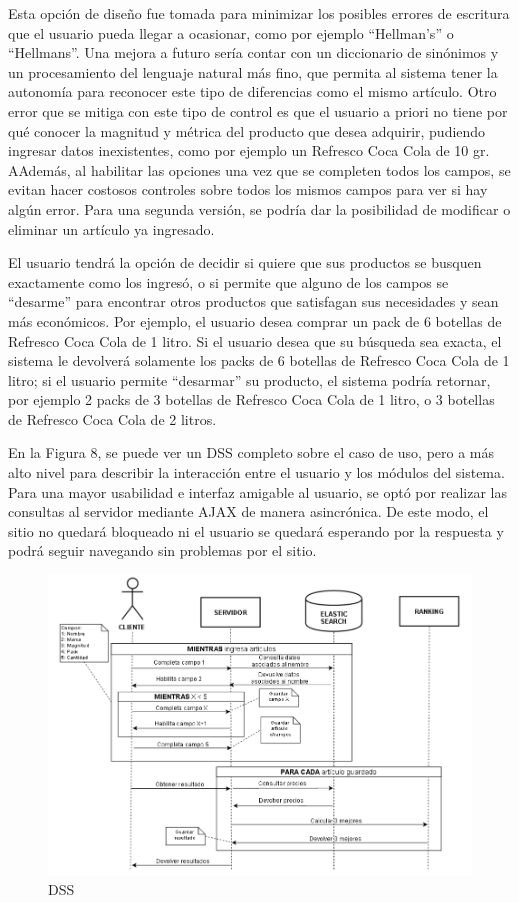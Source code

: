 \documentclass[12pt]{article} %
\begin{document}
Esta opción de diseño fue tomada para minimizar los posibles errores de escritura que el usuario pueda llegar a ocasionar, como por ejemplo “Hellman’s” o “Hellmans”. Una mejora a futuro sería contar con un diccionario de sinónimos y un procesamiento del lenguaje natural más fino, que permita al sistema tener la autonomía para reconocer este tipo de diferencias como el mismo artículo. Otro error que se mitiga con este tipo de control es que el usuario a priori no tiene por qué conocer la magnitud y métrica del producto que desea adquirir, pudiendo ingresar datos inexistentes, como por ejemplo un Refresco Coca Cola de 10 gr. AAdemás, al habilitar las opciones una vez que se completen todos los campos, se evitan hacer costosos controles sobre todos los mismos campos para ver si hay algún error. Para una segunda versión, se podría dar la posibilidad de modificar o eliminar un artículo ya ingresado.

El usuario tendrá la opción de decidir si quiere que sus productos se busquen exactamente como los ingresó, o si permite que alguno de los campos se “desarme” para encontrar otros productos que satisfagan sus necesidades y sean más económicos. 
Por ejemplo, el usuario desea comprar un pack de 6 botellas de Refresco Coca Cola de 1 litro. Si el usuario desea que su búsqueda sea exacta, el sistema le devolverá solamente los packs de 6 botellas de Refresco Coca Cola de 1 litro; si el usuario permite “desarmar” su producto, el sistema podría retornar, por ejemplo 2 packs de 3 botellas de Refresco Coca Cola de 1 litro, o 3 botellas de Refresco Coca Cola de 2 litros.


En la Figura 8, se puede ver un DSS completo sobre el caso de uso, pero a más alto nivel para describir la interacción entre el usuario y los módulos del sistema. Para una mayor usabilidad e interfaz amigable al usuario, se optó por realizar las consultas al servidor mediante AJAX de manera asincrónica. De este modo, el sitio no quedará bloqueado ni el usuario se quedará esperando por la respuesta y podrá seguir navegando sin problemas por el sitio.

\begin{figure}[H]
\includegraphics[height=0.40\textwidth]{DSS}
\centering
\caption{DSS}
\end{figure}
\end{document}
